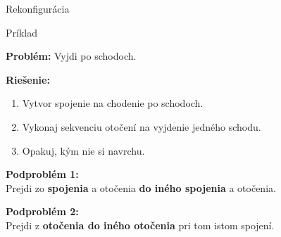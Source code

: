 \documentclass{beamer}
\begin{document}
\begin{frame}{Rekonfigurácia}
\begin{center}
\end{center}
\end{frame}

\begin{frame}{Príklad}

  \textbf{Problém:} Vyjdi po schodoch.

  \pause

  \textbf{Riešenie: }
  \begin{enumerate}
    \item Vytvor spojenie na chodenie po schodoch.
    \item Vykonaj sekvenciu otočení na vyjdenie jedného schodu.
    \item Opakuj, kým nie si navrchu.
  \end{enumerate}

  \pause

  \textbf{Podproblém 1:}\\
  Prejdi zo \textbf{spojenia} a otočenia \textbf{do iného spojenia} a otočenia.

  \pause

  \textbf{Podproblém 2:}\\
  Prejdi z \textbf{otočenia do iného otočenia} pri tom istom spojení.
\end{frame}
\end{document}
